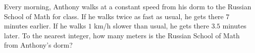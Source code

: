 Every morning, Anthony walks at a constant speed from his dorm to the Russian School of Math for class. If he walks twice as fast as usual, he gets there $7$ minutes earlier. If he walks $1$ km/h slower than usual, he gets there $3.5$ minutes later. To the nearest integer, how many meters is the Russian School of Math from Anthony's dorm?
